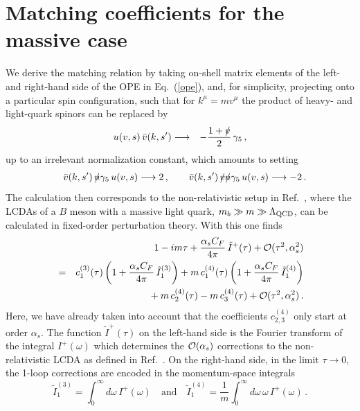 \documentclass[a4paper,11pt]{article}
\begin{document}
\section{Matching coefficients for the massive case}

\label{sec:match}

We derive the matching relation by taking on-shell matrix elements of the left- and right-hand side of the OPE in Eq.~(\ref{ope}), 
and, for simplicity, projecting onto a particular spin configuration, such that for $k^\mu = m v^\mu$ the product of heavy- and light-quark
spinors can be replaced by
\begin{eqnarray*}
  u(v,s) \, \bar v(k,s') &\longrightarrow& - \frac{1+\slashed v}{2} \, \gamma_5 \,,
\end{eqnarray*}
up to an irrelevant normalization constant,
which amounts to setting
\begin{eqnarray*} 
&&  \bar v(k,s') \, \slashed n \gamma_5 \, u(v,s)  \longrightarrow  2 \,, 
  \qquad 
  \bar v(k,s') \, \slashed v \slashed n \gamma_5 \, u(v,s)  \longrightarrow  -2 \,.
\end{eqnarray*}
%
The calculation then corresponds to the non-relativistic setup in Ref.~\cite{Bell:2008er}, where the LCDAs of a $B$ meson with a massive light quark, $m_b \gg m \gg \Lambda_{\rm QCD}$, can be calculated in fixed-order perturbation theory.
%
With this one finds
\begin{eqnarray}
    && 1 - i m \tau + \frac{\alpha_s C_F}{4\pi} \, \tilde I^+(\tau)
    + \mathcal{O}(\tau^2, \alpha_s^2)
    \cr
    &=& c_1^{(3)}(\tau) \left(1 + \frac{\alpha_s C_F}{4\pi} \, \tilde I_1^{(3)} \right)
    + m \, c_1^{(4)}(\tau) \left(1 + \frac{\alpha_s C_F}{4\pi} \, \tilde I_1^{(4)}
        \right)
    \cr && {}
    + m \, c_2^{(4)}(\tau)
    - m \, c_3^{(4)}(\tau)
    + \mathcal{O}(\tau^2,\alpha_s^2) \,.
\end{eqnarray}
%
Here, we have already taken into account that the coefficients $c_{2,3}^{(4)}$ only start at order $\alpha_s$.
The function $\tilde I^+(\tau)$ on the left-hand side 
is the Fourier transform of the integral $I^+(\omega)$ which determines the ${\cal O}(\alpha_s)$ corrections to the non-relativistic LCDA 
as defined in Ref.~\cite{Bell:2008er}.
On the right-hand side, in the limit $\tau \to 0$,
the 1-loop corrections are encoded in the momentum-space integrals
\begin{equation}
    \tilde I_1^{(3)} = \int_0^\infty d{\omega}\, I^+(\omega)
    \quad \mathrm{and} \quad
    \tilde I_1^{(4)} = \frac{1}{m} \int_0^\infty d{\omega}\, \omega \, I^+(\omega) \,.
\end{equation}
\end{document}
